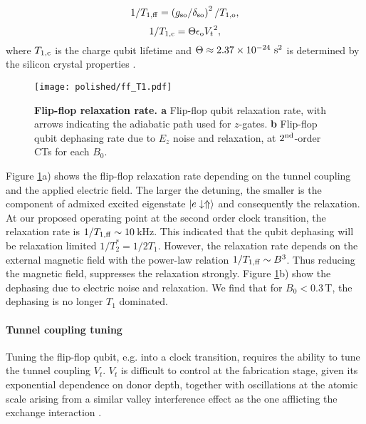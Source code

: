 \begin{equation}\label{eq:T1ff}
{1}/{T_{1,\rm ff}}=\left({g_{\rm so}}/{\delta_{\rm so}}\right)^2/{T_{1,\rm o}},
\end{equation}
\begin{equation}\label{eq:T1o}
{1}/{T_{1,\rm c}}=\Theta\epsilon_{\rm o}{V_t}^2,
\end{equation}
where $T_{1,\rm c}$ is the charge qubit lifetime and $\Theta\approx2.37\times10^{-24}~{\rm s}^2$ is determined by the silicon crystal properties \cite{Boross2016}.

\begin{figure}[h]
	\centering
	\texttt{[image: polished/ff\_T1.pdf]}
	\caption[Flip-flop relaxation rate]{\textbf{Flip-flop relaxation rate. a }Flip-flop qubit relaxation rate, with arrows indicating the adiabatic path used for $z$-gates. \textbf{b} Flip-flop qubit dephasing rate due to $E_z$ noise and relaxation, at $2^{\rm nd}$-order CTs for each $B_0$.}
	\label{fig:T1}
\end{figure}

Figure \ref{fig:T1}a) shows the flip-flop relaxation rate depending on the tunnel coupling and the applied electric field. The larger the detuning, the smaller is the component of admixed excited eigenstate $|e\downarrow\Uparrow\rangle$ and consequently the relaxation. At our proposed operating point at the second order clock transition, the relaxation rate is ${1}/{T_{1,\rm ff}}\sim 10\, $kHz. This indicated that the qubit dephasing will be relaxation limited $1/T_2^*=1/2T_1$. However, the relaxation rate depends on the external magnetic field with the power-law relation $1/T_{1,\rm{ff}}\sim B^3$. Thus reducing the magnetic field, suppresses the relaxation strongly. Figure \ref{fig:T1}b) show the dephasing due to electric noise and relaxation. We find that for $B_0<0.3\,$T, the dephasing is no longer $T_1$ dominated. 


\paragraph{Tunnel coupling tuning}

Tuning the flip-flop qubit, e.g. into a clock transition, requires the ability to tune the tunnel coupling $V_t$. $V_t$ is difficult to control at the fabrication stage, given its exponential dependence on donor depth, together with oscillations at the atomic scale \cite{Calderon2008} arising from a similar valley interference effect as the one afflicting the exchange interaction \cite{Koiller2002}. 

